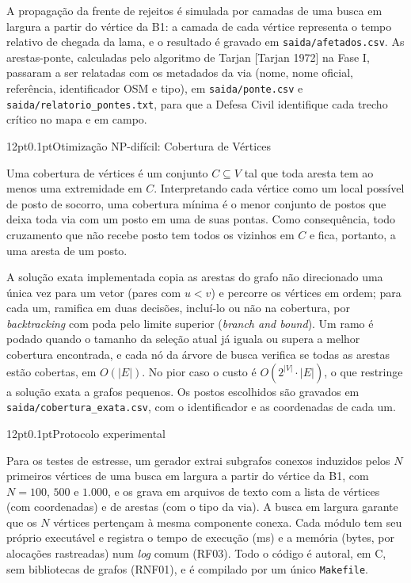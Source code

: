 \documentclass[12pt,a4paper]{article}
\makeatletter
\renewcommand\subsection{\@startsection{subsection}{2}{\z@}%
  {12pt}{0.1pt}{\normalfont\normalsize\bfseries}}
\makeatother
\begin{document}
A propagação da frente de rejeitos é simulada por camadas de uma busca em largura a partir do vértice da B1: a camada de cada vértice representa o tempo relativo de chegada da lama, e o resultado é gravado em \texttt{saida/afetados.csv}. As arestas-ponte, calculadas pelo algoritmo de Tarjan [Tarjan 1972] na Fase I, passaram a ser relatadas com os metadados da via (nome, nome oficial, referência, identificador OSM e tipo), em \texttt{saida/ponte.csv} e \texttt{saida/relatorio\_pontes.txt}, para que a Defesa Civil identifique cada trecho crítico no mapa e em campo.

\subsection{Otimização NP-difícil: Cobertura de Vértices}

Uma cobertura de vértices é um conjunto $C \subseteq V$ tal que toda aresta tem ao menos uma extremidade em $C$. Interpretando cada vértice como um local possível de posto de socorro, uma cobertura mínima é o menor conjunto de postos que deixa toda via com um posto em uma de suas pontas. Como consequência, todo cruzamento que não recebe posto tem todos os vizinhos em $C$ e fica, portanto, a uma aresta de um posto.

A solução exata implementada copia as arestas do grafo não direcionado uma única vez para um vetor (pares com $u < v$) e percorre os vértices em ordem; para cada um, ramifica em duas decisões, incluí-lo ou não na cobertura, por \emph{backtracking} com poda pelo limite superior (\emph{branch and bound}). Um ramo é podado quando o tamanho da seleção atual já iguala ou supera a melhor cobertura encontrada, e cada nó da árvore de busca verifica se todas as arestas estão cobertas, em $O(|E|)$. No pior caso o custo é $O(2^{|V|}\cdot|E|)$, o que restringe a solução exata a grafos pequenos. Os postos escolhidos são gravados em \texttt{saida/cobertura\_exata.csv}, com o identificador e as coordenadas de cada um.

\subsection{Protocolo experimental}

Para os testes de estresse, um gerador extrai subgrafos conexos induzidos pelos $N$ primeiros vértices de uma busca em largura a partir do vértice da B1, com $N = 100$, $500$ e $1.000$, e os grava em arquivos de texto com a lista de vértices (com coordenadas) e de arestas (com o tipo da via). A busca em largura garante que os $N$ vértices pertençam à mesma componente conexa. Cada módulo tem seu próprio executável e registra o tempo de execução (ms) e a memória (bytes, por alocações rastreadas) num \emph{log} comum (RF03). Todo o código é autoral, em C, sem bibliotecas de grafos (RNF01), e é compilado por um único \texttt{Makefile}.
\end{document}
